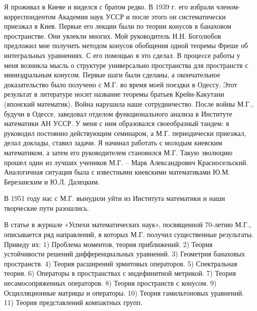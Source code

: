 Я проживал в Киеве и виделся с братом редко. В 1939 г. его избрали членом-корреспондентом Академии наук УССР и после этого он систематически приезжал в Киев. Первые его лекции были по теории конусов в банаховом пространстве. Они увлекли многих. Мой руководитель Н.Н. Боголюбов предложил мне получить методом конусов обобщения одной теоремы Фреше об интегральных уравнениях. С его помощью я это сделал. В процессе работы у меня возникла мысль о структуре универсально пространства для пространств с миниэдральным конусом. Первые шаги были сделаны, а окончательное доказательство было получено с М.Г. во время моей поездки в Одессу. Этот результат в литературе носит название теоремы братьев Крейн-Какутани (японский математик).
Война нарушила наше сотрудничество. После войны М.Г., будучи в Одессе, заведовал отделом функционального анализа в Институте математики АН УССР. У меня с ним образовался своеобразный тандем: я руководил постоянно действующим семинаром, а М.Г. периодически приезжал, делал доклады, ставил задачи. Я начинал работать с молодым киевским математиком, а затем его руководителем становился М.Г. Такую эволюцию прошел один из лучших учеников М.Г.  – Марк Александрович Красносельский. Аналогичная ситуация была с известными киевскими математиками Ю.М. Березанским и Ю.Л. Далецким.

В 1951 году нас с М.Г. вынудили уйти из Института математики и наши творческие пути разошлись.

В статье в журнале «Успехи математических наук», посвященной 70-летию М.Г., описывается ряд направлений, в которых М.Г. получил существенные результаты. Приведу их:  1) Проблема моментов, теория приближений. 2) Теория устойчивости решений дифференциальных уравнений. 3) Геометрия банаховых пространств. 4) Теория расширений эрмитовых операторов. 5) Спектральная теория. 6) Операторы в пространствах с индефинитной метрикой. 7) Теория несамосопряженных операторов. 8) Теория пространств с конусом. 9) Осцилляционные матрицы и операторы. 10) Теория гамильтоновых уравнений. 11) Теория представлений компактных групп.

